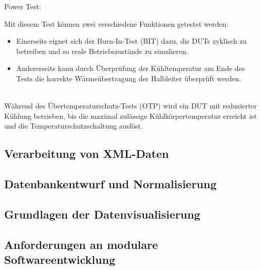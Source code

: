 Power Test:

Mit diesem Test können zwei verschiedene Funktionen getestet werden:
\begin{itemize}
    \item Einerseits eignet sich der Burn-In-Test (BIT) dazu, die DUTs zyklisch zu betreiben und so reale Betriebszustände zu simulieren.
    \item Andererseits kann durch Überprüfung der Kühltemperatur am Ende des Tests die korrekte Wärmeübertragung der Halbleiter überprüft werden.
\end{itemize}
\\
Während des Übertemperaturschutz-Tests (OTP) wird ein DUT mit reduzierter Kühlung betrieben, bis die maximal zulässige Kühlkörpertemperatur erreicht ist und die Temperaturschutzschaltung auslöst.


\subsection{Verarbeitung von XML-Daten}

\subsection{Datenbankentwurf und Normalisierung}

\subsection{Grundlagen der Datenvisualisierung}

\subsection{Anforderungen an modulare Softwareentwicklung}